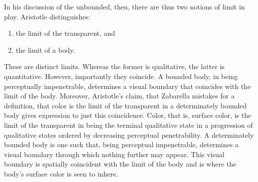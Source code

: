 In his discussion of the unbounded, then, there are thus two notions of limit in play. Aristotle distinguishes:
\begin{enumerate}[(1)]
	\item the limit of the transparent, and
	\item the limit of a body.
\end{enumerate}
These are distinct limits. Whereas the former is qualitative, the latter is quantitative. However, importantly they coincide. A bounded body, in being perceptually impenetrable, determines a visual boundary that coincides with the limit of the body. Moreover, Aristotle's claim, that Zabarella mistakes for a definition, that color is the limit of the transparent in a determinately bounded body gives expression to just this coincidence. Color, that is, surface color, is the limit of the transparent in being the terminal qualitative state in a progression of qualitative states ordered by decreasing perceptual penetrability. A determinately bounded body is one such that, being perceptual impenetrable, determines a visual boundary through which nothing further may appear. This visual boundary is spatially coincident with the limit of the body and is where the body's surface color is seen to inhere.

